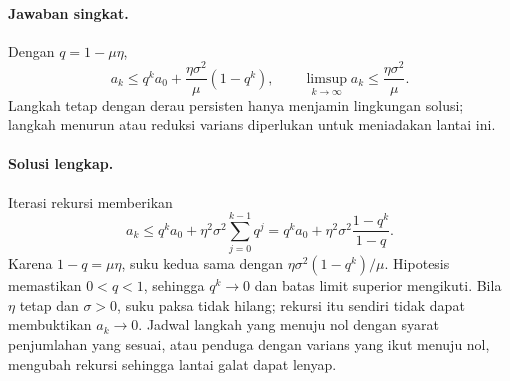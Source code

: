\paragraph{Jawaban singkat.}
\label{orig03:ps04:answer:0005}
Dengan $q=1-\mu\eta$,
\[
 a_k\le q^k a_0+\frac{\eta\sigma^2}{\mu}(1-q^k),
 \qquad
 \limsup_{k\to\infty}a_k\le\frac{\eta\sigma^2}{\mu}.
\]
Langkah tetap dengan derau persisten hanya menjamin lingkungan solusi;
langkah menurun atau reduksi varians diperlukan untuk meniadakan lantai ini.

\paragraph{Solusi lengkap.}
\label{orig03:ps04:solution:0005}
Iterasi rekursi memberikan
\[
 a_k\le q^k a_0+\eta^2\sigma^2\sum_{j=0}^{k-1}q^j
 =q^k a_0+\eta^2\sigma^2\frac{1-q^k}{1-q}.
\]
Karena $1-q=\mu\eta$, suku kedua sama dengan
$\eta\sigma^2(1-q^k)/\mu$. Hipotesis memastikan $0<q<1$, sehingga
$q^k\to0$ dan batas limit superior mengikuti. Bila $\eta$ tetap dan
$\sigma>0$, suku paksa tidak hilang; rekursi itu sendiri tidak dapat
membuktikan $a_k\to0$. Jadwal langkah yang menuju nol dengan syarat penjumlahan
yang sesuai, atau penduga dengan varians yang ikut menuju nol, mengubah
rekursi sehingga lantai galat dapat lenyap.
